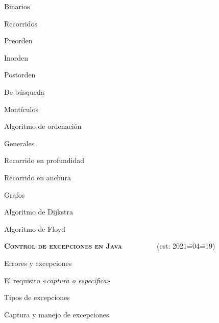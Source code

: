 \begin{longenum}
\begin{longenum}
        \begin{longenum}
            \item Binarios
            \begin{longenum}
                \item Recorridos
                \begin{longenum}
                    \item Preorden
                    \item Inorden
                    \item Postorden
                \end{longenum}
            \end{longenum}
            \item De búsqueda
            \item Montículos
            \begin{longenum}
                \item Algoritmo de ordenación
            \end{longenum}
            \item Generales
            \begin{longenum}
                \item Recorrido en profundidad
                \item Recorrido en anchura
            \end{longenum}
        \end{longenum}
        \item Grafos
        \begin{longenum}
            \item Algoritmo de Dijkstra
            \item Algoritmo de Floyd
        \end{longenum}
    \end{longenum}
    \item \textbf{\textsc{Control de excepciones en Java}} \ \ \ \ \ \ \ \ \ (est: 2021\==04\==19)
    \begin{longenum}
        \item Errores y excepciones
        \item El requisito «\textit{captura o especifica}»
        \begin{longenum}
            \item Tipos de excepciones
        \end{longenum}
        \item Captura y manejo de excepciones

\end{longenum}
\end{longenum}

